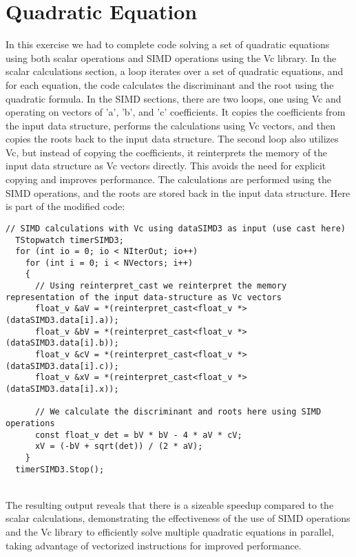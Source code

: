 \documentclass{article}
\begin{document}
\section{Quadratic Equation}
In this exercise we had to complete code solving a set of quadratic equations using both scalar operations and SIMD operations using the Vc library. In the scalar calculations section, a loop iterates over a set of quadratic equations, and for each equation, the code calculates the discriminant and the root using the quadratic formula. In the SIMD  sections, there are two loops, one using Vc and operating on vectors of 'a', 'b', and 'c' coefficients. It copies the coefficients from the input data structure, performs the calculations using Vc vectors, and then copies the roots back to the input data structure.
The second loop also utilizes Vc, but instead of copying the coefficients, it reinterprets the memory of the input data structure as Vc vectors directly. This avoids the need for explicit copying and improves performance. The calculations are performed using the SIMD operations, and the roots are stored back in the input data structure. Here is part of the modified code:  

\begin{lstlisting}[caption=QuadraticEquation.cpp]
 // SIMD calculations with Vc using dataSIMD3 as input (use cast here)
  TStopwatch timerSIMD3;
  for (int io = 0; io < NIterOut; io++)
    for (int i = 0; i < NVectors; i++)
    {
      // Using reinterpret_cast we reinterpret the memory representation of the input data-structure as Vc vectors
      float_v &aV = *(reinterpret_cast<float_v *>(dataSIMD3.data[i].a));
      float_v &bV = *(reinterpret_cast<float_v *>(dataSIMD3.data[i].b));
      float_v &cV = *(reinterpret_cast<float_v *>(dataSIMD3.data[i].c));
      float_v &xV = *(reinterpret_cast<float_v *>(dataSIMD3.data[i].x));

      // We calculate the discriminant and roots here using SIMD operations
      const float_v det = bV * bV - 4 * aV * cV;
      xV = (-bV + sqrt(det)) / (2 * aV);
    }
  timerSIMD3.Stop();
\end{lstlisting} \\

The resulting output reveals that there is a sizeable speedup compared to the scalar calculations,  demonstrating the effectiveness of the use of SIMD operations and the Vc library to efficiently solve multiple quadratic equations in parallel, taking advantage of vectorized instructions for improved performance.
\end{document}

